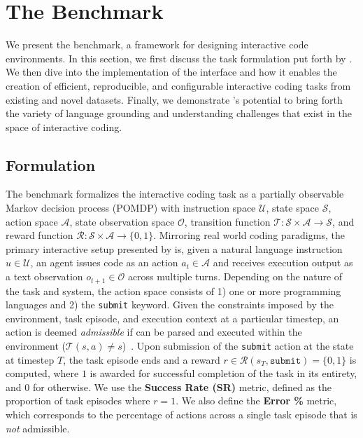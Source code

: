 \section{The \benchmark{} Benchmark}
\label{sec:benchmark}

We present the \benchmark{} benchmark, a framework for designing interactive code environments. In this section, we first discuss the task formulation put forth by \benchmark{}. We then dive into the implementation of the \benchmark{} interface and how it enables the creation of efficient, reproducible, and configurable interactive coding tasks from existing and novel datasets. Finally, we demonstrate \benchmark{}'s potential to bring forth the variety of language grounding and understanding challenges that exist in the space of interactive coding.

\subsection{Formulation}
\label{sec:benchmark:formulation}
The \benchmark{} benchmark formalizes the interactive coding task as a partially observable Markov decision process (POMDP) with instruction space $\mathcal{U}$, state space $\mathcal{S}$, action space $\mathcal{A}$, state observation space $\mathcal{O}$, transition function $\mathcal{T}: \mathcal{S} \times \mathcal{A} \to \mathcal{S}$, and reward function $\mathcal{R}: \mathcal{S} \times \mathcal{A} \to \{0, 1\}$. Mirroring real world coding paradigms, the primary interactive setup presented by \benchmark{} is, given a natural language instruction $u \in \mathcal{U}$, an agent issues code as an action $a_t \in \mathcal{A}$ and receives execution output as a text observation $o_{t+1} \in \mathcal{O}$ across multiple turns. Depending on the nature of the task and system, the action space consists of 1) one or more programming languages and 2) the \texttt{submit} keyword. Given the constraints imposed by the environment, task episode, and execution context at a particular timestep, an action is deemed \textit{admissible} if can be parsed and executed within the environment ($\mathcal{T}(s, a) \neq s$)~\cite{yao2020calm}. Upon submission of the \texttt{submit} action at the state at timestep $T$, the task episode ends and a reward $r \in \mathcal{R}(s_T, \texttt{submit}) = \{0, 1\}$ is computed, where $1$ is awarded for successful completion of the task in its entirety, and $0$ for otherwise. We use the \textbf{Success Rate (SR)} metric, defined as the proportion of task episodes where $r = 1$. We also define the \textbf{Error \%} metric, which corresponds to the percentage of actions across a single task episode that is \textit{not} admissible.

